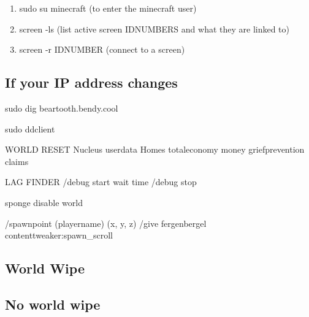 \documentclass{report}
\begin{document}
\begin{enumerate}
	\item sudo su minecraft   (to enter the minecraft user)
	\item screen -ls		  (list active screen IDNUMBERS and what they are linked to)
	\item screen -r IDNUMBER  (connect to a screen)
\end{enumerate}
 
 
\subsection{If your IP address changes}

sudo dig beartooth.bendy.cool

sudo ddclient


WORLD RESET
Nucleus userdata Homes
totaleconomy money
griefprevention claims

LAG FINDER
/debug start
wait time
/debug stop

sponge disable world

/spawnpoint (playername)  (x, y, z)
/give fergenbergel contenttweaker:spawn\_scroll



\subsection{World Wipe}

\subsection{No world wipe}
\end{document}
